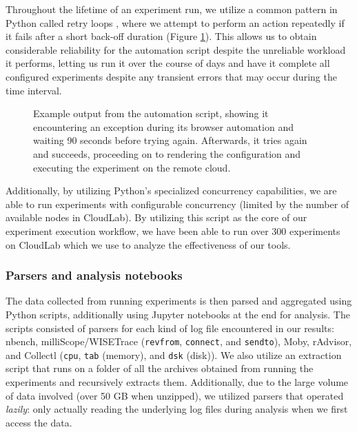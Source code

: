 \documentclass[a4paper,11pt]{article}
\begin{document}
Throughout the lifetime of an experiment run,
we utilize a common pattern in Python called retry loops \cite{pragmatic},
where we attempt to perform an action repeatedly if it fails after a short back-off duration (Figure \ref{fig:automation_retry}).
This allows us to obtain considerable reliability for the automation script
despite the unreliable workload it performs,
letting us run it over the course of days and have it complete all configured experiments
despite any transient errors that may occur during the time interval.

\begin{figure}
    \caption{
        Example output from the automation script, showing it encountering an exception
        during its browser automation and waiting 90 seconds before trying again.
        Afterwards, it tries again and succeeds, proceeding on to rendering the configuration
        and executing the experiment on the remote cloud.
    }
    \label{fig:automation_retry}
    \vspace{1em}
\end{figure}

Additionally, by utilizing Python's specialized concurrency capabilities,
we are able to run experiments with configurable concurrency
(limited by the number of available nodes in CloudLab).
By utilizing this script as the core of our experiment execution workflow,
we have been able to run over 300 experiments on CloudLab which we use to analyze the effectiveness of our tools.

\subsubsection{Parsers and analysis notebooks}

The data collected from running experiments is then parsed and aggregated using Python scripts,
additionally using Jupyter notebooks at the end for analysis.
The scripts consisted of parsers for each kind of log file encountered in our results:
nbench, milliScope/WISETrace (\texttt{revfrom}, \texttt{connect}, and \texttt{sendto}),
Moby, rAdvisor, and Collectl (\texttt{cpu}, \texttt{tab} (memory), and \texttt{dsk} (disk)).
We also utilize an extraction script that runs on a folder of all the archives obtained from running the experiments
and recursively extracts them.
Additionally, due to the large volume of data involved (over 50 GB when unzipped),
we utilized parsers that operated \textit{lazily}:
only actually reading the underlying log files during analysis when we first access the data.
\end{document}
